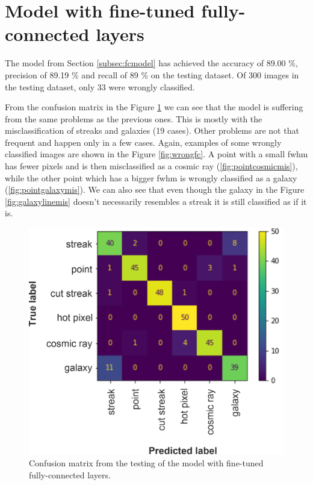 \section{Model with fine-tuned fully-connected layers}
The model from Section \ref{subsec:fcmodel} has achieved the accuracy of 89.00 \%, precision of 89.19 \% and recall of 89 \% on the testing dataset. Of 300 images in the testing dataset, only 33 were wrongly classified. 

From the confusion matrix in the Figure \ref{img:confmatrixfc} we can see that the model is suffering from the same problems as the previous ones. This is mostly with the misclassification of streaks and galaxies (19 cases). Other problems are not that frequent and happen only in a few cases. Again, examples of some wrongly classified images are shown in the Figure \ref{fig:wrongfc}.
A point with a small fwhm has fewer pixels and is then misclassified as a cosmic ray (\ref{fig:pointcosmicmis}), while the other point which has a bigger fwhm is wrongly classified as a galaxy (\ref{fig:pointgalaxymis}). We can also see that even though the galaxy in the Figure \ref{fig:galaxylinemis} doesn't necessarily resembles a streak it is still classified as if it is. 

\begin{figure}[h]
    \centering
    \includegraphics[width=.5\textwidth]{images/confusionMatrix14fe.png}
    \caption{Confusion matrix from the testing of the model with fine-tuned fully-connected layers.}
    \label{img:confmatrixfc}
\end{figure}

